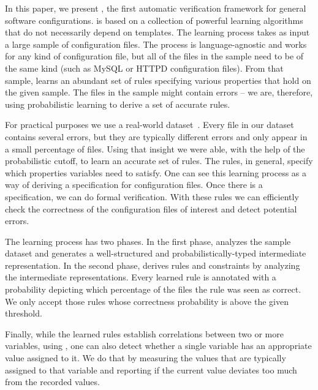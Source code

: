 In this paper, we present \app, the first automatic verification framework
for general software configurations. \app is based on a collection of powerful learning 
algorithms that do not necessarily depend on templates. The learning process takes as input a
 large sample of configuration files. The process is language-agnostic and works for any kind of configuration file, 
but all of the files in the sample need to be of the same kind (such as
MySQL or HTTPD configuration files).
From that sample,
\app learns an abundant set of rules specifying various properties that hold on the given sample. The files in the sample might contain
errors -- we are, therefore, using probabilistic learning to derive a set of accurate rules. 

For practical purposes we use a real-world dataset~\cite{configdataset}. 
Every file in our dataset contains several errors, 
but they are typically different errors and only appear 
in a small percentage of files. Using that insight we were able, with the help of the probabilistic cutoff, to learn an
accurate set of rules. The rules, in general, specify which properties variables need to satisfy. One can see this learning process as a
way of deriving  
a specification for configuration files.  Once there is a specification, we can do formal verification. With these 
rules we can efficiently check the correctness of the configuration files
of interest and detect potential errors.

The learning process has two phases. In the first phase, 
\app analyzes the sample dataset and generates a 
well-structured and probabilistically-typed 
intermediate representation. 
In the second phase, \app derives rules and constraints by analyzing
the intermediate representations.  Every learned rule is annotated with a probability 
depicting which percentage of the files the rule was seen as correct. We only accept those rules whose 
correctness probability is above the given threshold. 

Finally, while the learned rules establish correlations between two or more variables, using \app, one can also detect whether a
single variable has an appropriate value assigned to it. We do that by measuring the values that are typically assigned to that variable 
and reporting if the current value deviates too much from the recorded values.

